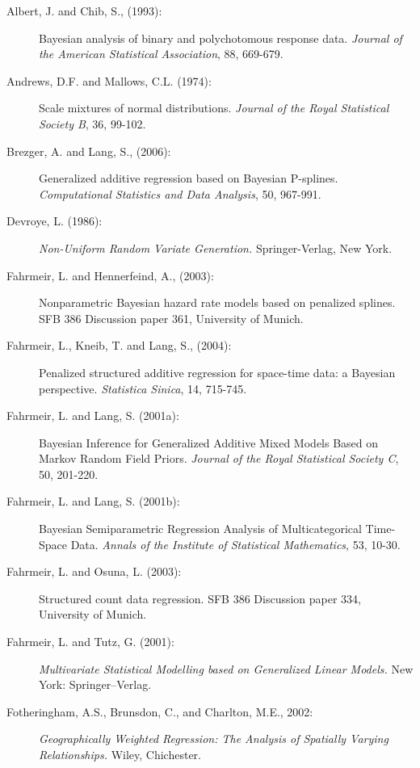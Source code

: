 \documentclass[11pt,a4paper,twoside]{bayesxarticle}
\begin{document}
\begin{description}
\item[Albert, J. and Chib, S., (1993):]
Bayesian analysis of binary and polychotomous response data. {\it
Journal of the American Statistical Association},  88, 669-679.


\item[Andrews, D.F. and Mallows, C.L. (1974):]
Scale mixtures of normal distributions. {\it Journal of the Royal
Statistical Society B}, 36, 99-102.


\item[Brezger, A. and Lang, S., (2006):]
Generalized additive regression based on Bayesian P-splines. {\it
Computational Statistics and Data Analysis}, 50, 967-991.

\item[Devroye, L. (1986):]
{\it Non-Uniform Random Variate Generation.} Springer-Verlag, New
York.


\item[Fahrmeir, L. and Hennerfeind, A., (2003):]
Nonparametric Bayesian hazard rate models based on penalized
splines. SFB 386 Discussion paper 361, University of Munich.

\item[Fahrmeir, L., Kneib, T. and Lang, S., (2004):] Penalized
structured additive regression for space-time data: a Bayesian
perspective. {\em Statistica Sinica}, 14, 715-745.

\item[Fahrmeir, L. and Lang, S. (2001a):] Bayesian Inference for
Generalized Additive Mixed Models Based on Markov Random Field
Priors. {\em Journal of the Royal Statistical Society C}, 50,
201-220.

\item[Fahrmeir, L. and Lang, S. (2001b):] Bayesian Semiparametric Regression Analysis of Multicategorical
Time-Space Data. {\em Annals of the  Institute of Statistical
Mathematics}, 53, 10-30.

\item[Fahrmeir, L. and Osuna, L. (2003):] Structured count data regression.
SFB 386 Discussion paper 334, University of Munich.

\item[Fahrmeir, L. and Tutz, G. (2001):] {\em Multivariate Statistical
Modelling based on Generalized Linear Models.} New York:
Springer--Verlag.

\item[Fotheringham, A.S., Brunsdon, C., and Charlton, M.E., 2002:]
{\it Geographically Weighted Regression: The Analysis of Spatially
Varying Relationships.} Wiley, Chichester.



\end{description}
\end{document}
